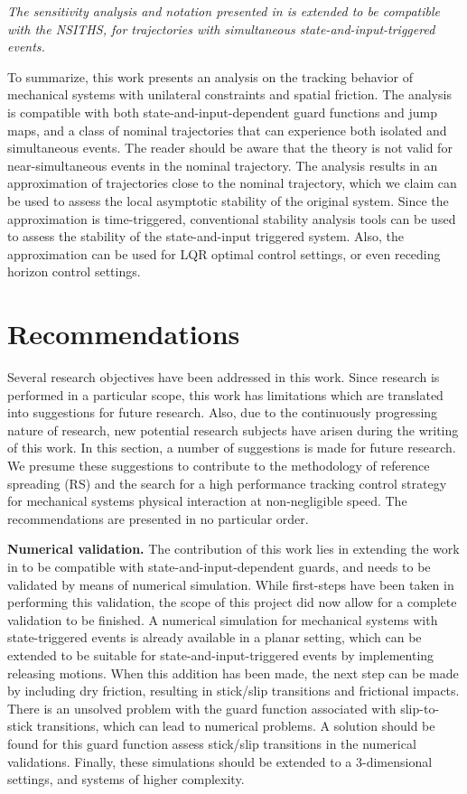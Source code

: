 \documentclass[../DC2019003Bouma.tex]{subfiles}
\begin{document}
\textit{The sensitivity analysis and notation presented in \cite{Rijnen2018a} is extended to be compatible with the NSITHS, for trajectories with simultaneous state-and-input-triggered events.}

To summarize, this work presents an analysis on the tracking behavior of mechanical systems with unilateral constraints and spatial friction. The analysis is compatible with both state-and-input-dependent guard functions and jump maps, and a class of nominal trajectories that can experience both isolated and simultaneous events. The reader should be aware that the theory is not valid for near-simultaneous events in the nominal trajectory. The analysis results in an approximation of trajectories close to the nominal trajectory, which we claim can be used to assess the local asymptotic stability of the original system. Since the approximation is time-triggered, conventional stability analysis tools can be used to assess the stability of the state-and-input triggered system. Also, the approximation can be used for LQR optimal control settings, or even receding horizon control settings.

\section{Recommendations}\label{sec:6rec}
Several research objectives have been addressed in this work. Since research is performed in a particular scope, this work has limitations which are translated into suggestions for future research. Also, due to the continuously progressing nature of research, new potential research subjects have arisen during the writing of this work. In this section, a number of suggestions is made for future research. We presume these suggestions to contribute to the methodology of reference spreading (RS) and the search for a high performance tracking control strategy for mechanical systems physical interaction at non-negligible speed. The recommendations are presented in no particular order.

\textbf{Numerical validation.} The contribution of this work lies in extending the work in \cite{Rijnen2018a} to be compatible with state-and-input-dependent guards, and needs to be validated by means of numerical simulation. While first-steps have been taken in performing this validation, the scope of this project did now allow for a complete validation to be finished. A numerical simulation for mechanical systems with state-triggered events is already available in a planar setting, which can be extended to be suitable for state-and-input-triggered events by implementing releasing motions. When this addition has been made, the next step can be made by including dry friction, resulting in stick/slip transitions and frictional impacts. There is an unsolved problem with the guard function associated with slip-to-stick transitions, which can lead to numerical problems. A solution should be found for this guard function assess stick/slip transitions in the numerical validations. Finally, these simulations should be extended to a 3-dimensional settings, and systems of higher complexity.
\end{document}
